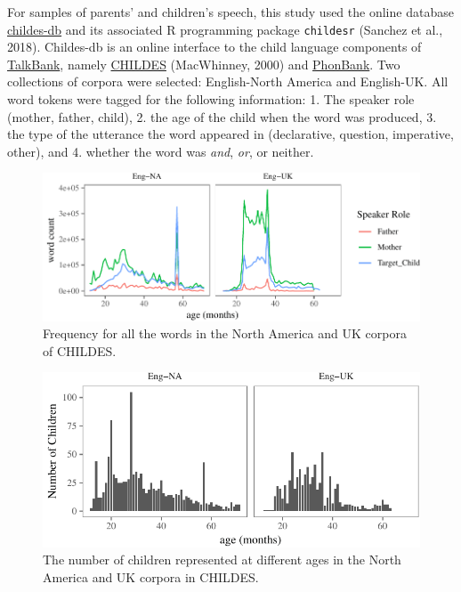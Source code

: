 \documentclass[oneside]{report}
\theoremstyle{definition}
\theoremstyle{definition}
\theoremstyle{definition}
\theoremstyle{remark}
\begin{document}
For samples of parents' and children's speech, this study used the
online database \href{childes-db.stanford.edu}{childes-db} and its
associated R programming package \texttt{childesr} (Sanchez et al.,
2018). Childes-db is an online interface to the child language
components of \href{https://talkbank.org/}{TalkBank}, namely
\href{https://childes.talkbank.org/}{CHILDES} (MacWhinney, 2000) and
\href{https://phonbank.talkbank.org/}{PhonBank}. Two collections of
corpora were selected: English-North America and English-UK. All word
tokens were tagged for the following information: 1. The speaker role
(mother, father, child), 2. the age of the child when the word was
produced, 3. the type of the utterance the word appeared in
(declarative, question, imperative, other), and 4. whether the word was
\emph{and}, \emph{or}, or neither.
\begin{figure}[tb]

{\centering \includegraphics{figs/corpusDensityPlot-1} 

}

\caption{Frequency for all the words in the North America and UK corpora of CHILDES.}\label{fig:corpusDensityPlot}
\end{figure}
\begin{figure}[tb]

{\centering \includegraphics{figs/childDensityPlot-1} 

}

\caption{The number of children represented at different ages in the North America and UK corpora in CHILDES.}\label{fig:childDensityPlot}
\end{figure}
\end{document}
